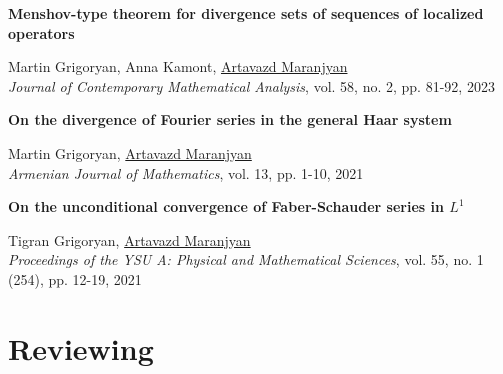 \documentclass[10pt,a4paper,sans]{moderncv}        %
\begin{document}
{\parbox[t]{\linewidth}{\textbf{%
  Menshov-type theorem for divergence sets of sequences of localized operators
  }}}
{}{}{}
{
  \normalsize
  Martin Grigoryan, Anna Kamont, \underline{Artavazd Maranjyan}\\
  \textit{Journal of Contemporary Mathematical Analysis}, vol. 58, no. 2, pp. 81-92, 2023
}

{\parbox[t]{\linewidth}{\textbf{%
  On the divergence of Fourier series in the general Haar system
  }}}
{}{}{}
{
  \normalsize
  Martin Grigoryan, \underline{Artavazd Maranjyan}\\
  \textit{Armenian Journal of Mathematics}, vol. 13, pp. 1-10, 2021
}

{\parbox[t]{\linewidth}{\textbf{%
  On the unconditional convergence of Faber-Schauder series in $L^1$
  }}}
{}{}{}
{
  \normalsize
  Tigran Grigoryan, \underline{Artavazd Maranjyan}\\
  \textit{Proceedings of the YSU A: Physical and Mathematical Sciences}, vol. 55, no. 1 (254), pp. 12-19, 2021
}

\section{Reviewing}





\end{document}
